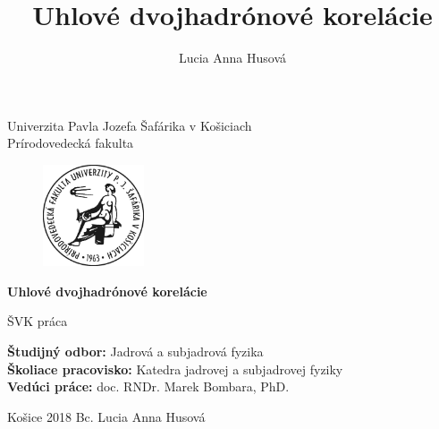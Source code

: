\documentclass[thesismargins, thesislinespacing]{rnthesis}
\title{Uhlové dvojhadrónové korelácie}
\author{Lucia Anna Husová}
\begin{document}
\begin{center}
	{\Large Univerzita Pavla Jozefa Šafárika v Košiciach} \\
	{\Large Prírodovedecká fakulta} 
\end{center}

\vspace*{2cm}

\begin{figure}[htbp!]
	\begin{center}
		\includegraphics[width=3cm]{./Obrazky_praca/logo-pf-upjs-cb.jpg}
	\end{center}
\end{figure}

\vspace*{2cm}

\begin{center}
	{\LARGE\bf Uhlové dvojhadrónové korelácie}
\end{center}

\begin{center}
	{\large ŠVK práca}
\end{center}

\vspace*{5cm}
\begin{flushleft}
{\bf Študijný odbor:}{ Jadrová a subjadrová fyzika} \\
{\bf Školiace pracovisko: }{Katedra jadrovej a subjadrovej fyziky}\\
{\bf Vedúci práce: }{doc. RNDr. Marek Bombara, PhD.}\\
\end{flushleft}
 
 \vspace*{2cm}
 \begin{flushleft}
{\large Košice 2018}
\hspace*{5cm}
{\large Bc. Lucia Anna Husová}
\end{flushleft}

\thispagestyle{empty}
\newpage

\maketitle
\newpage
\tableofcontents
\newpage
\end{document}
